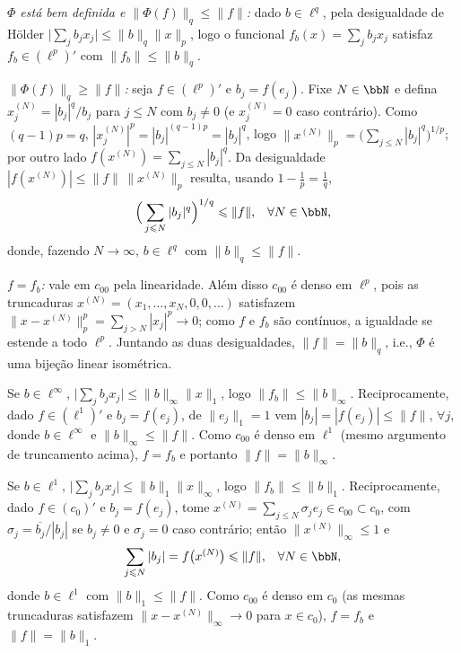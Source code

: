 \begin{myproof}
	\textit{$\Phi$ está bem definida e $\|\Phi(f)\|_q\leq\|f\|$:} dado $b\in\ell^q$, pela desigualdade de
	Hölder $\big|\sum_jb_jx_j\big|\leq\|b\|_q\|x\|_p$, logo o funcional $f_b(x)=\sum_jb_jx_j$ satisfaz
	$f_b\in(\ell^p)'$ com $\|f_b\|\leq\|b\|_q$.

	\textit{$\|\Phi(f)\|_q\geq\|f\|$:} seja $f\in(\ell^p)'$ e $b_j=f(e_j)$. Fixe $N\in\bbN$ e defina
	$x^{(N)}_j=|b_j|^{q}/b_j$ para $j\leq N$ com $b_j\neq0$ (e $x_j^{(N)}=0$ caso contrário). Como
	$(q-1)p=q$, $|x_j^{(N)}|^p=|b_j|^{(q-1)p}=|b_j|^q$, logo
	$\|x^{(N)}\|_p=\big(\sum_{j\leq N}|b_j|^q\big)^{1/p}$; por outro lado
	$f(x^{(N)})=\sum_{j\leq N}|b_j|^q$. Da desigualdade $|f(x^{(N)})|\leq\|f\|\,\|x^{(N)}\|_p$ resulta,
	usando $1-\frac1p=\frac1q$,
	$$\Big(\sum_{j\leq N}|b_j|^q\Big)^{1/q}\leq\|f\|\text{,}\quad\forall N\in\bbN\text{,}$$
	donde, fazendo $N\to\infty$, $b\in\ell^q$ com $\|b\|_q\leq\|f\|$.

	\textit{$f=f_b$:} vale em $c_{00}$ pela linearidade. Além disso $c_{00}$ é denso em $\ell^p$, pois as
	truncaduras $x^{(N)}=(x_1,\dots,x_N,0,0,\dots)$ satisfazem
	$\|x-x^{(N)}\|_p^p=\sum_{j>N}|x_j|^p\to0$; como $f$ e $f_b$ são contínuos, a igualdade se estende a
	todo $\ell^p$. Juntando as duas desigualdades, $\|f\|=\|b\|_q$, i.e., $\Phi$ é uma bijeção linear
	isométrica.
\end{myproof}

\begin{myproof}
	Se $b\in\ell^\infty$, $\big|\sum_jb_jx_j\big|\leq\|b\|_\infty\|x\|_1$, logo $\|f_b\|\leq\|b\|_\infty$.
	Reciprocamente, dado $f\in(\ell^1)'$ e $b_j=f(e_j)$, de $\|e_j\|_1=1$ vem
	$|b_j|=|f(e_j)|\leq\|f\|$, $\forall j$, donde $b\in\ell^\infty$ e $\|b\|_\infty\leq\|f\|$. Como
	$c_{00}$ é denso em $\ell^1$ (mesmo argumento de truncamento acima), $f=f_b$ e portanto
	$\|f\|=\|b\|_\infty$.
\end{myproof}

\begin{myproof}
	Se $b\in\ell^1$, $\big|\sum_jb_jx_j\big|\leq\|b\|_1\|x\|_\infty$, logo $\|f_b\|\leq\|b\|_1$.
	Reciprocamente, dado $f\in(c_0)'$ e $b_j=f(e_j)$, tome $x^{(N)}=\sum_{j\leq N}\sigma_je_j\in
	c_{00}\subset c_0$, com $\sigma_j=\overline{b_j}/|b_j|$ se $b_j\neq0$ e $\sigma_j=0$ caso contrário; então
	$\|x^{(N)}\|_\infty\leq1$ e
	$$\sum_{j\leq N}|b_j|=f\big(x^{(N)}\big)\leq\|f\|\text{,}\quad\forall N\in\bbN\text{,}$$
	donde $b\in\ell^1$ com $\|b\|_1\leq\|f\|$. Como $c_{00}$ é denso em $c_0$ (as mesmas truncaduras
	satisfazem $\|x-x^{(N)}\|_\infty\to0$ para $x\in c_0$), $f=f_b$ e $\|f\|=\|b\|_1$.
\end{myproof}

